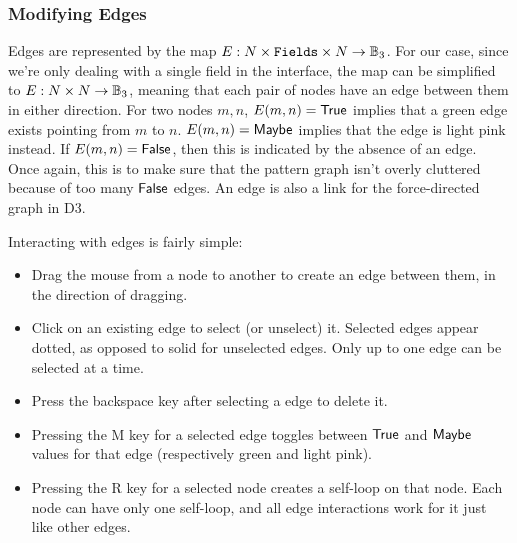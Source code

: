 \subsubsection{Modifying Edges}
Edges are represented by the map
$E: N \times \mathtt{Fields} \times N \to \mathbb{B}_3$. For our case, since
we're only dealing with a single field in the interface, the map can be simplified to
$E: N \times N \to \mathbb{B}_3$, meaning that each pair of nodes
have an edge between them in either direction. For two nodes
$m, n$, $E(m, n) = \mathsf{True}$ implies that a green edge exists pointing from $m$ to
$n$. $E(m, n) = \mathsf{Maybe}$ implies that the edge is light pink instead. If
$E(m, n) = \mathsf{False}$, then this is indicated by the absence of an edge. Once again,
this is to make sure that the pattern graph isn't overly cluttered because of too many
$\mathsf{False}$ edges. An edge is also a link for the force-directed graph in D3.

Interacting with edges is fairly simple:
\begin{itemize}
  \item Drag the mouse from a node to another to create an edge between them, in the direction of dragging.
  \item Click on an existing edge to select (or unselect) it. Selected edges appear dotted, as opposed to solid for unselected edges. Only up to one edge can be selected at a time.
  \item Press the backspace key after selecting a edge to delete it.
  \item Pressing the M key for a selected edge toggles between $\mathsf{True}$ and $\mathsf{Maybe}$ values for that edge (respectively green and light pink).
  \item Pressing the R key for a selected node creates a self-loop on that node. Each node can have only one self-loop, and all edge interactions work for it just like other edges.
\end{itemize}

